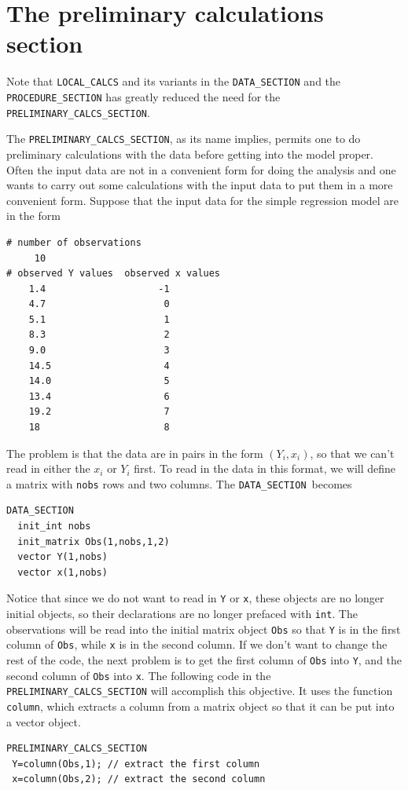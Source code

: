 \documentclass{admbmanual}
\newcommand\DS{\texttt{DATA\_SECTION}}
\begin{document}
\section{The preliminary calculations section}

Note that \texttt{LOCAL\_CALCS} and its variants in the
\texttt{DATA\_SECTION} and the \texttt{PROCEDURE\_SECTION}  has
greatly reduced the need for the \texttt{PRELIMINARY\_CALCS\_SECTION}.

The \texttt{PRELIMINARY\_CALCS\_SECTION}, as its name implies,
permits one to do preliminary calculations with the data
before getting into
the model proper.  Often the input data are not in a convenient form
for doing the analysis and one wants to carry out some calculations with
the input data to put them in a more convenient form.
Suppose that the input data for the simple regression model are in the form
\begin{lstlisting}
# number of observations
     10
# observed Y values  observed x values
    1.4                    -1
    4.7                     0
    5.1                     1
    8.3                     2
    9.0                     3
    14.5                    4
    14.0                    5
    13.4                    6
    19.2                    7
    18                      8
\end{lstlisting}
The problem is that the data are in pairs in the 
form $(Y_i,x_i)$, so that we can't read in either the 
$x_i$ or $Y_i$ first.  To read in the data in this format, 
we will define a matrix  with \texttt{nobs} rows and two
columns.
The  \DS\ becomes
\begin{lstlisting}
DATA_SECTION
  init_int nobs
  init_matrix Obs(1,nobs,1,2) 
  vector Y(1,nobs)
  vector x(1,nobs)
\end{lstlisting}
Notice that since we do not want to read in \texttt{Y} or
\texttt{x}, these objects are no longer initial objects, so their
declarations are no longer prefaced with \texttt{int}. 
The observations will be read into the initial matrix object \texttt{Obs}
so that \texttt{Y}  is in the first column of \texttt{Obs}, while
\texttt{x} is in the second column.
If we don't want to change the rest of the code, the next problem is to
get the first column of \texttt{Obs} into \texttt{Y}, and the second column
of \texttt{Obs} into \texttt{x}.
The following code in the \texttt{PRELIMINARY\_CALCS\_SECTION}
will accomplish this objective. It uses the function \texttt{column},
which extracts a column from a matrix object so that it can be put into a
vector object. 
\begin{lstlisting}
PRELIMINARY_CALCS_SECTION
 Y=column(Obs,1); // extract the first column
 x=column(Obs,2); // extract the second column
\end{lstlisting}
\end{document}
